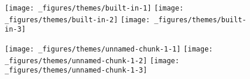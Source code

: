 \begin{Shaded}
\begin{Highlighting}[]
\StringTok{ }\NormalTok{(} \NormalTok{:}\NormalTok{, } \NormalTok{:}\NormalTok{)}
\StringTok{ }\StringTok{ }\NormalTok{()}
\StringTok{ }\NormalTok{() +}\StringTok{ }\NormalTok{(}\NormalTok{)}
\StringTok{ }\NormalTok{() +}\StringTok{ }\NormalTok{(}\NormalTok{)}
\StringTok{ }\NormalTok{() +}\StringTok{ }\NormalTok{(}\NormalTok{)}
\end{Highlighting}
\end{Shaded}

\begin{figure}[H]
  \texttt{[image: \_figures/themes/built-in-1]}%
  \texttt{[image: \_figures/themes/built-in-2]}%
  \texttt{[image: \_figures/themes/built-in-3]}
\end{figure}

\begin{Shaded}
\begin{Highlighting}[]
\StringTok{ }\NormalTok{() +}\StringTok{ }\NormalTok{(}\NormalTok{)}
\StringTok{ }\NormalTok{() +}\StringTok{ }\NormalTok{(}\NormalTok{)}
\StringTok{ }\NormalTok{()  +}\StringTok{ }\NormalTok{(}\NormalTok{)}
\end{Highlighting}
\end{Shaded}

\begin{figure}[H]
  \texttt{[image: \_figures/themes/unnamed-chunk-1-1]}%
  \texttt{[image: \_figures/themes/unnamed-chunk-1-2]}%
  \texttt{[image: \_figures/themes/unnamed-chunk-1-3]}
\end{figure}


